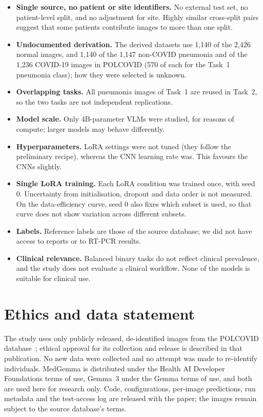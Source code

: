 \documentclass[11pt]{article}
\begin{document}
\begin{itemize}
  \item \textbf{Single source, no patient or site identifiers.} No external test set, no
  patient-level split, and no adjustment for site. Highly similar cross-split pairs suggest that
  some patients contribute images to more than one split.
  \item \textbf{Undocumented derivation.} The derived datasets use 1,140 of the 2,426 normal
  images, and 1,140 of the 1,147 non-COVID pneumonia and of the 1,236 COVID-19 images in POLCOVID
  (570 of each for the Task~1 pneumonia class); how they were selected is unknown.
  \item \textbf{Overlapping tasks.} All pneumonia images of Task~1 are reused in Task~2, so the
  two tasks are not independent replications.
  \item \textbf{Model scale.} Only 4B-parameter VLMs were studied, for reasons of compute; larger
  models may behave differently.
  \item \textbf{Hyperparameters.} LoRA settings were not tuned (they follow the preliminary
  recipe), whereas the CNN learning rate was. This favours the CNNs slightly.
  \item \textbf{Single LoRA training.} Each LoRA condition was trained once, with seed 0.
  Uncertainty from initialisation, dropout and data order is not measured. On the
  data-efficiency curve, seed 0 also fixes which subset is used, so that curve does not
  show variation across different subsets.
  \item \textbf{Labels.} Reference labels are those of the source database; we did not have
  access to reports or to RT-PCR results.
  \item \textbf{Clinical relevance.} Balanced binary tasks do not reflect clinical prevalence,
  and the study does not evaluate a clinical workflow. None of the models is suitable for
  clinical use.
\end{itemize}

\section{Ethics and data statement}

The study uses only publicly released, de-identified images from the POLCOVID
database~\citep{suwalska2023polcovid}; ethical approval for its collection and release is
described in that publication. No new data were collected
and no attempt was made to re-identify individuals. MedGemma is distributed under the Health AI
Developer Foundations terms of use, Gemma~3 under the Gemma terms of use, and both are used here
for research only. Code, configurations, per-image predictions, run metadata and the test-access
log are released with the paper; the images remain subject to the source database's terms.
\end{document}
